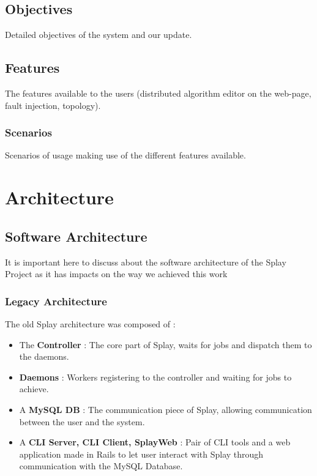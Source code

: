 \documentclass{eplmastersthesis}
\begin{document}
    \section{Objectives}

      Detailed objectives of the system and our update.

    \section{Features}

      The features available to the users (distributed algorithm editor on the
      web-page, fault injection, topology).

      \subsection{Scenarios}

        Scenarios of usage making use of the different features available.

  \chapter{Architecture}

    \section{Software Architecture}

      It is important here to discuss about the software architecture of the
      Splay Project as it has impacts on the way we achieved this work

      \subsection{Legacy Architecture}

        The old Splay architecture was composed of :

        \begin{itemize}
          \item The \textbf{Controller} : The core part of Splay, waits for jobs
          and dispatch them to the daemons.
          \item \textbf{Daemons} : Workers registering to the controller and waiting
          for jobs to achieve.
          \item A \textbf{MySQL DB} : The communication piece of Splay, allowing
          communication between the user and the system.
          \item A \textbf{CLI Server, CLI Client, SplayWeb} : Pair of CLI tools
          and a web application made in Rails to let user interact with
          Splay through communication with the MySQL Database.
        \end{itemize}
\end{document}
